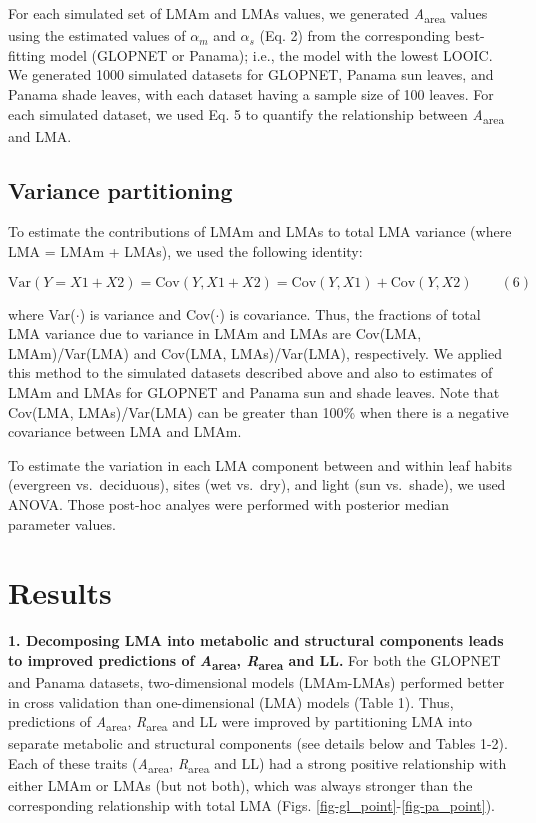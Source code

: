 \documentclass[
  12pt,
  letterpaper,
  DIV=11,
  numbers=noendperiod]{scrartcl}
\begin{document}
For each simulated set of LMAm and LMAs values, we generated
\emph{A}\textsubscript{area} values using the estimated values of
\(\alpha_m\) and \(\alpha_s\) (Eq. 2) from the corresponding
best-fitting model (GLOPNET or Panama); i.e., the model with the lowest
LOOIC. We generated 1000 simulated datasets for GLOPNET, Panama sun
leaves, and Panama shade leaves, with each dataset having a sample size
of 100 leaves. For each simulated dataset, we used Eq. 5 to quantify the
relationship between \emph{A}\textsubscript{area} and LMA.

\hypertarget{variance-partitioning}{%
\subsection{Variance partitioning}\label{variance-partitioning}}

To estimate the contributions of LMAm and LMAs to total LMA variance
(where LMA = LMAm + LMAs), we used the following identity:

\[
\mathrm{Var}(Y = X1 + X2) = \mathrm{Cov}(Y, X1+X2) = \mathrm{Cov}(Y,X1) + \mathrm{Cov}(Y,X2) \qquad(6)
\]

where Var(\(\cdot\)) is variance and Cov(\(\cdot\)) is covariance. Thus,
the fractions of total LMA variance due to variance in LMAm and LMAs are
Cov(LMA, LMAm)/Var(LMA) and Cov(LMA, LMAs)/Var(LMA), respectively. We
applied this method to the simulated datasets described above and also
to estimates of LMAm and LMAs for GLOPNET and Panama sun and shade
leaves. Note that Cov(LMA, LMAs)/Var(LMA) can be greater than 100\% when
there is a negative covariance between LMA and LMAm.

To estimate the variation in each LMA component between and within leaf
habits (evergreen vs.~deciduous), sites (wet vs.~dry), and light (sun
vs.~shade), we used ANOVA. Those post-hoc analyes were performed with
posterior median parameter values.

\hypertarget{results}{%
\section{Results}\label{results}}

\textbf{1. Decomposing LMA into metabolic and structural components
leads to improved predictions of \emph{A}\textsubscript{area},
\emph{R}\textsubscript{area} and LL.} For both the GLOPNET and Panama
datasets, two-dimensional models (LMAm-LMAs) performed better in cross
validation than one-dimensional (LMA) models (Table 1). Thus,
predictions of \emph{A}\textsubscript{area},
\emph{R}\textsubscript{area} and LL were improved by partitioning LMA
into separate metabolic and structural components (see details below and
Tables 1-2). Each of these traits (\emph{A}\textsubscript{area},
\emph{R}\textsubscript{area} and LL) had a strong positive relationship
with either LMAm or LMAs (but not both), which was always stronger than
the corresponding relationship with total LMA (Figs.
\ref{fig-gl_point}-\ref{fig-pa_point}).
\end{document}
